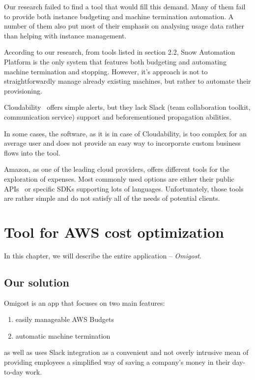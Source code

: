 \documentclass[licencjacka,en]{thesisclass}
\begin{document}
    Our research failed to find a tool that would fill this demand.
    Many of them fail to provide both instance budgeting and machine termination automation.
    A number of them also put most of their emphasis on analysing usage data rather than
    helping with instance management.

    According to our research, from tools listed in section 2.2, Snow Automation Platform
    is the only system that features both budgeting and automating
    machine termination and stopping.
    However, it's approach is not to straightforwardly manage already existing machines,
    but rather to automate their provisioning.

    Cloudability~\cite{CloudabilityAlerts} offers simple alerts, but they lack
    Slack (team collaboration toolkit, communication service) support
    and beforementioned propagation abilities.

    In some cases, the software, as it is in case of Cloudability, is too complex
    for an average user and does not provide an easy way
    to incorporate custom business flows into the tool.

    Amazon, as one of the leading cloud providers,
    offers different tools for the exploration of expenses.
    Most commonly used options are either their public APIs~\cite{AWSCostManagement}
    or specific SDKs supporting lots of languages.
    Unfortunately, those tools are rather simple and do not satisfy
    all of the needs of potential clients.

    \chapter{Tool for AWS cost optimization}

    In this chapter, we will describe the entire application -- \textit{Omigost}.

    \section{Our solution}

    Omigost is an app that focuses on two main features:
    \begin{enumerate}
        \item easily manageable AWS Budgets
        \item automatic machine termination
    \end{enumerate}

    as well as uses Slack integration as a convenient and not overly intrusive mean
    of providing employees a simplified way of saving a company's money in their day-to-day work.
\end{document}
